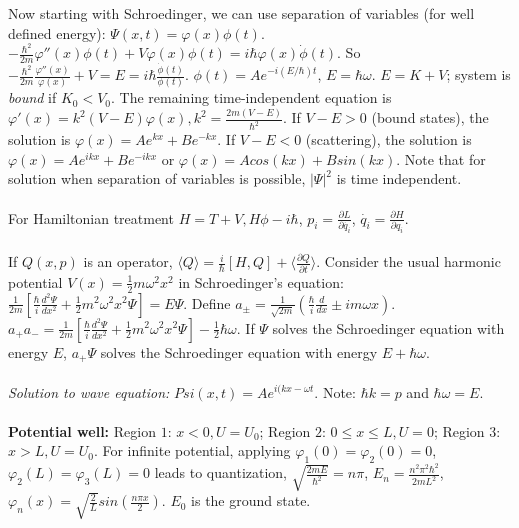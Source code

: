 Now starting with Schroedinger, we can use separation of variables (for well defined
energy): $\Psi(x,t)= \varphi(x) \phi(t)$. 
$-{\frac {\hbar^2} {2m}} \varphi''(x) \phi(t) + 
V \varphi(x) \phi(t)= i \hbar \varphi(x) {\dot \phi}(t)$. 
So $-{\frac {\hbar^2} {2m}} {\frac {\varphi''(x)} {\varphi(x)}} + V = E=
i \hbar {\frac {{\dot \phi}(t)} {\phi(t)}}$. $\phi(t)= A e^{-i(E/\hbar)t}$,
$E= \hbar \omega$.  $E=K+V$; system is \emph{bound} if $K_0<V_0$.  The
remaining time-independent equation is
$\varphi'(x)= k^2 (V-E) \varphi(x), k^2= {\frac {2m(V-E)} {\hbar^2}}$.  
If $V-E>0$ (bound states), the solution is 
$\varphi(x)= A e^{kx}+ B e^{-kx}$.
If $V-E<0$ (scattering), the solution is 
$\varphi(x)= A e^{ikx}+ B e^{-ikx}$ or
$\varphi(x)= A cos(kx)+ B sin(kx)$.
Note that for solution when separation of variables is possible, $|\Psi|^2$ is time 
independent.  \\
\\
For Hamiltonian treatment
$H= T+V, H \phi - i \hbar$, $p_i = {\frac {\partial L}{\partial {\dot{q_i}}}}$,
$\dot{q_i} = {\frac {\partial H} {\partial {q_i}}}$.
\\
\\
If $Q(x,p)$ is an operator,
$\langle Q \rangle = {\frac {i} {\hbar}} [H, Q] + \langle {\frac {\partial Q} {\partial t}} \rangle$.
Consider the usual harmonic potential $V(x) = {\frac 1 2} m \omega^2 x^2$ in Schroedinger's equation:
${\frac {1} {2m}}[{\frac {\hbar} {i}} {\frac {d^2 \Psi}{dx^2}} + {\frac 1 2} m^2 \omega^2 x^2 \Psi]= E \Psi$.
Define $a_{\pm} = {\frac 1 {\sqrt {2m}}} ({\frac {\hbar} {i}} {\frac d {dx}} \pm i m \omega x)$.
$a_+ a_- = {\frac {1} {2m}}[{\frac {\hbar} {i}} {\frac {d^2 \Psi}{dx^2}} + {\frac 1 2} m^2 \omega^2 x^2 \Psi] - 
{\frac 1 2} \hbar \omega$.  If $\Psi$ solves the Schroedinger equation with energy $E$, $a_+ \Psi$  solves
the Schroedinger equation with energy $E + \hbar \omega$.\\
\\
\emph{Solution to wave equation:} $Psi(x, t) = A e^{i(kx- \omega t}$.  Note: $\hbar k = p$ and $\hbar \omega = E$.
\\
\\
{\bf Potential well:}  
Region $1$: $x<0, U=U_0$; 
Region $2$: $0 \le x \le L, U=0$; 
Region $3$: $x > L, U=U_0$.  
For infinite potential, applying
$\varphi_1(0)= \varphi_2(0)=0$,
$\varphi_2(L)= \varphi_3(L)=0$ leads to quantization, 
${\sqrt {\frac {2mE}{\hbar^2}}} = n \pi$, $E_n= {\frac {n^2 \pi^2 \hbar^2} {2mL^2}}$,  
$\varphi_n(x)= {\sqrt {\frac 2 L}} sin({\frac {n \pi x} 2})$.  $E_0$ is the ground state.
